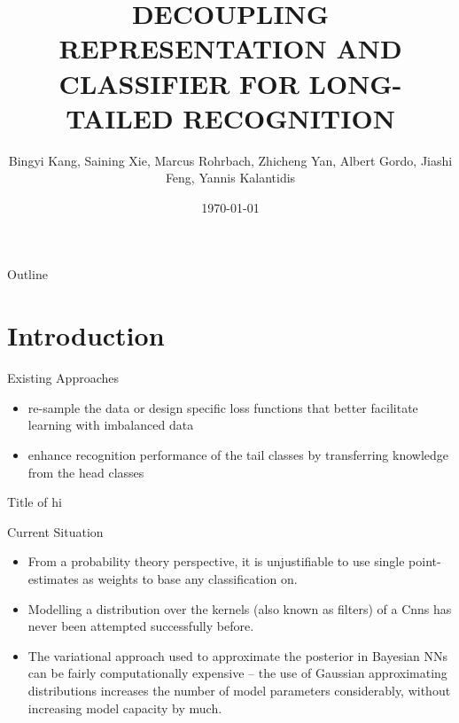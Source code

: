 \documentclass{beamer}
\title{DECOUPLING REPRESENTATION AND CLASSIFIER FOR LONG-TAILED RECOGNITION}
\author{Bingyi Kang, Saining Xie, Marcus Rohrbach, Zhicheng Yan, Albert Gordo, Jiashi Feng, Yannis Kalantidis}
\date{\today}
\begin{document}

\frame{\titlepage}

\section[Outline]{}
\begin{frame}{Outline}
  \tableofcontents
\end{frame}

\section{Introduction}
\begin{frame}{Existing Approaches}
  \begin{itemize}
    \item<1-> re-sample the data or design specific loss functions that better facilitate learning with imbalanced data
    \item<1-> enhance recognition performance of the tail classes by transferring knowledge from the head classes
  \end{itemize}
  
  \begin{block}{Title of}
    hi
  \end{block}
\end{frame}
\begin{frame}{Current Situation}
  \begin{itemize}
    \item<1-> From a probability theory perspective, it is unjustifiable to use single point-estimates as weights to base any classification on.
    \item<1-> Modelling a distribution over the kernels (also known as filters) of a Cnns has never been attempted successfully before.
    \item<1-> The variational approach used to approximate the posterior in Bayesian NNs can be fairly computationally expensive – the use of Gaussian approximating distributions increases the number of model parameters considerably, without increasing model capacity by much.
  \end{itemize}
\end{frame}
\end{document}
